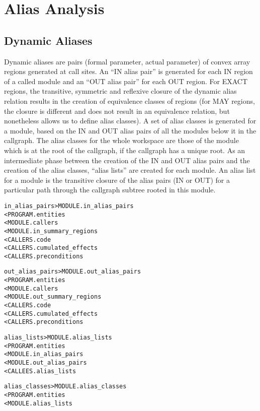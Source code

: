 \documentclass[a4paper]{report}
\newenvironment{PipsMake}{\begin{alltt}}{\end{alltt}}
\begin{document}

\section{Alias Analysis}
\label{subsection-alias-analysis}

\subsection{Dynamic Aliases}
\label{subsubsection-dynamic-aliases}

Dynamic aliases are pairs (formal parameter, actual parameter) of
convex array regions
generated at call sites. An ``IN alias pair'' is generated for each IN
region of
a called module and an ``OUT alias pair'' for each OUT region. For EXACT
regions, the transitive, symmetric and reflexive closure of the dynamic
alias relation results in the creation of equivalence classes of regions
(for MAY regions, the closure is different and does not
result in an equivalence relation, but nonetheless allows us to define alias
classes). A set of alias
classes is generated for a module, based on the IN and OUT alias
pairs of all the modules below it in the callgraph. The alias classes for
the whole workspace are those of the module which is at the root of the
callgraph, if the callgraph has a unique root. As an intermediate phase
between the creation of the
IN and OUT alias pairs and the creation of the alias classes, ``alias
lists'' are created for each module. An alias list for a module is the
transitive closure of the alias pairs (IN or OUT) for a particular path
through the callgraph subtree rooted in this module.

\begin{PipsMake}
in_alias_pairs > MODULE.in_alias_pairs
        < PROGRAM.entities
        < MODULE.callers
        < MODULE.in_summary_regions
        < CALLERS.code
        < CALLERS.cumulated_effects
        < CALLERS.preconditions

out_alias_pairs > MODULE.out_alias_pairs
        < PROGRAM.entities
        < MODULE.callers
        < MODULE.out_summary_regions
        < CALLERS.code
        < CALLERS.cumulated_effects
        < CALLERS.preconditions

alias_lists > MODULE.alias_lists
        < PROGRAM.entities
        < MODULE.in_alias_pairs
        < MODULE.out_alias_pairs
        < CALLEES.alias_lists

alias_classes > MODULE.alias_classes
        < PROGRAM.entities
        < MODULE.alias_lists
\end{PipsMake}
\end{document}
